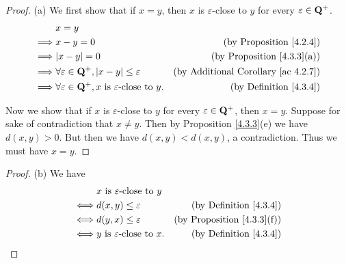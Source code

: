 \begin{proof}{(a)}
    We first show that if \(x = y\), then \(x\) is \(\varepsilon\)-close to \(y\) for every \(\varepsilon \in \mathbf{Q}^+\).
    \begin{align*}
                 & x = y                                                                                                                     \\
        \implies & x - y = 0                                                               & \text{(by Proposition \ref{4.2.4})}             \\
        \implies & \abs{x - y} = 0                                                         & \text{(by Proposition \ref{4.3.3}(a))}          \\
        \implies & \forall \varepsilon \in \Q^+, \abs{x - y} \leq \varepsilon              & \text{(by Additional Corollary \ref{ac 4.2.7})} \\
        \implies & \forall \varepsilon \in \Q^+, x \text{ is \(\varepsilon\)-close to } y. & \text{(by Definition \ref{4.3.4})}
    \end{align*}

    Now we show that if \(x\) is \(\varepsilon\)-close to \(y\) for every \(\varepsilon \in \mathbf{Q}^+\), then \(x = y\).
    Suppose for sake of contradiction that \(x \neq y\).
    Then by Proposition \ref{4.3.3}(e) we have \(d(x, y) > 0\).
    But then we have \(d(x, y) < d(x, y)\), a contradiction.
    Thus we must have \(x = y\).
\end{proof}

\begin{proof}{(b)}
    We have
    \begin{align*}
             & x \text{ is \(\varepsilon\)-close to } y                                           \\
        \iff & d(x, y) \leq \varepsilon                  & \text{(by Definition \ref{4.3.4})}     \\
        \iff & d(y, x) \leq \varepsilon                  & \text{(by Proposition \ref{4.3.3}(f))} \\
        \iff & y \text{ is \(\varepsilon\)-close to } x. & \text{(by Definition \ref{4.3.4})}
    \end{align*}
\end{proof}

